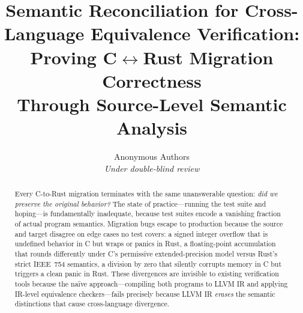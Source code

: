 \documentclass[11pt]{article}
\title{\textbf{Semantic Reconciliation for Cross-Language Equivalence Verification:\\
  Proving C$\leftrightarrow$Rust Migration Correctness\\Through Source-Level Semantic Analysis}}
\author{
  Anonymous Authors \\
  \textit{Under double-blind review}
}
\date{}
\begin{document}
\maketitle

\begin{abstract}
Every C-to-Rust migration terminates with the same unanswerable question: \emph{did we preserve the original behavior?}
The state of practice---running the test suite and hoping---is fundamentally inadequate, because test suites encode a vanishing fraction of actual program semantics.
Migration bugs escape to production because the source and target disagree on edge cases no test covers: a signed integer overflow that is undefined behavior in C but wraps or panics in Rust, a floating-point accumulation that rounds differently under C's permissive extended-precision model versus Rust's strict IEEE~754 semantics, a division by zero that silently corrupts memory in C but triggers a clean panic in Rust.
These divergences are invisible to existing verification tools because the na\"ive approach---compiling both programs to LLVM IR and applying IR-level equivalence checkers---fails precisely because LLVM IR \emph{erases} the semantic distinctions that cause cross-language divergence.


\end{abstract}
\end{document}
